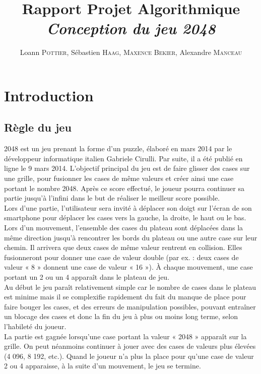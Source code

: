 \documentclass[13pt]{report}
\title{Rapport Projet Algorithmique  \\ \textit{Conception du jeu 2048}  }
\author{Loann \textsc{Pottier}, Sébastien \textsc{Haag}, \textsc{Maxence}  \textsc{Bekier}, Alexandre \textsc{Manceau} }
\begin{document}
\maketitle

\renewcommand{\thesection}{\textbf{\arabic{section}}}
\tableofcontents
\clearpage

\section{Introduction}

\subsection{Règle du jeu}
\large
\vspace{0.3cm}
2048 est un jeu prenant la forme d'un puzzle, élaboré en mars 2014 par le développeur informatique italien Gabriele Cirulli. Par suite, il a été publié en ligne le 9 mars 2014.
L'objectif principal du jeu est de faire glisser des cases sur une grille, pour fusionner les cases de même valeurs et créer ainsi une case portant le nombre 2048. Après ce score effectué, le joueur pourra continuer sa partie jusqu'à l'infini dans le but de réaliser le meilleur score possible.\\ 
Lors d'une partie, l'utilisateur sera invité à déplacer son doigt sur l'écran de son smartphone pour déplacer les cases vers la gauche, la droite, le haut ou le bas. Lors d'un mouvement, l'ensemble des cases du plateau sont déplacées dans la même direction jusqu'à rencontrer les bords du plateau ou une autre case sur leur chemin. Il arrivera que deux cases de même valeur rentrent en collision. Elles fusionneront pour donner une case de valeur double (par ex. : deux cases de valeur « 8 » donnent une case de valeur « 16 »). À chaque mouvement, une case portant un 2 ou un 4 apparaît dans le plateau de jeu.\\
Au début le jeu paraît relativement simple car le nombre de cases dans le plateau est minime mais il se complexifie rapidement du fait du manque de place pour faire bouger les cases, et des erreurs de manipulation possibles, pouvant entraîner un blocage des cases et donc la fin du jeu à plus ou moins long terme, selon l'habileté du joueur. \\
La partie est gagnée lorsqu'une case portant la valeur « 2048 » apparaît sur la grille. On peut néanmoins continuer à jouer avec des cases de valeurs plus élevées (4 096, 8 192, etc.). Quand le joueur n'a plus la place pour qu'une case de valeur 2 ou 4 apparaisse, à la suite d'un mouvement, le jeu se termine.
\end{document}
